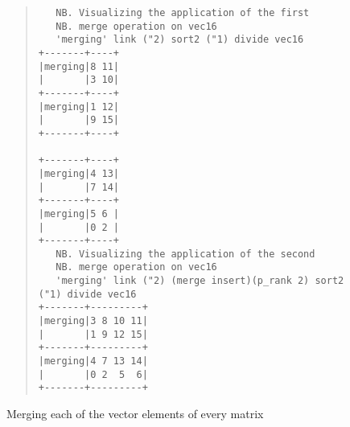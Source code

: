 \begin{figure}[hp]
\begin{quote}
\begin{singlespacing}
\begin{small}
\begin{verbatim}
   NB. Visualizing the application of the first
   NB. merge operation on vec16
   'merging' link ("2) sort2 ("1) divide vec16
+-------+----+
|merging|8 11|
|       |3 10|
+-------+----+
|merging|1 12|
|       |9 15|
+-------+----+

+-------+----+
|merging|4 13|
|       |7 14|
+-------+----+
|merging|5 6 |
|       |0 2 |
+-------+----+
   NB. Visualizing the application of the second
   NB. merge operation on vec16
   'merging' link ("2) (merge insert)(p_rank 2) sort2 ("1) divide vec16 
+-------+---------+
|merging|3 8 10 11|
|       |1 9 12 15|
+-------+---------+
|merging|4 7 13 14|
|       |0 2  5  6|
+-------+---------+
\end{verbatim}
\end{small}
\end{singlespacing}
\caption{Merging each of the vector elements of every matrix}
\label{fig::conquer}
\end{quote}

\end{figure}

